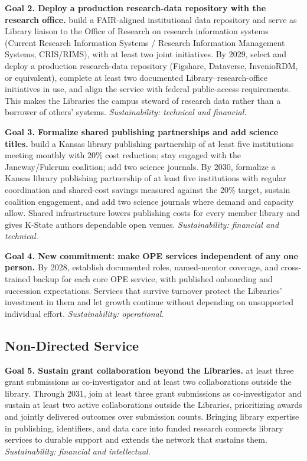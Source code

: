 \textbf{Goal 2. Deploy a production research-data repository with the research office.}  build a FAIR-aligned institutional data repository and serve as Library liaison to the Office of Research on research information systems (Current Research Information Systems / Research Information Management Systems, CRIS/RIMS), with at least two joint initiatives. By 2029, select and deploy a production research-data repository (Figshare, Dataverse, InvenioRDM, or equivalent), complete at least two documented Library--research-office initiatives in use, and align the service with federal public-access requirements. This makes the Libraries the campus steward of research data rather than a borrower of others' systems. \textit{Sustainability: technical and financial.}

\textbf{Goal 3. Formalize shared publishing partnerships and add science titles.}  build a Kansas library publishing partnership of at least five institutions meeting monthly with 20\% cost reduction; stay engaged with the Janeway/Fulcrum coalition; add two science journals. By 2030, formalize a Kansas library publishing partnership of at least five institutions with regular coordination and shared-cost savings measured against the 20\% target, sustain coalition engagement, and add two science journals where demand and capacity allow. Shared infrastructure lowers publishing costs for every member library and gives K-State authors dependable open venues. \textit{Sustainability: financial and technical.}

\textbf{Goal 4. New commitment: make OPE services independent of any one person.} By 2028, establish documented roles, named-mentor coverage, and cross-trained backup for each core OPE service, with published onboarding and succession expectations. Services that survive turnover protect the Libraries' investment in them and let growth continue without depending on unsupported individual effort. \textit{Sustainability: operational.}

\subsection{Non-Directed Service}
\textbf{Goal 5. Sustain grant collaboration beyond the Libraries.}  at least three grant submissions as co-investigator and at least two collaborations outside the library. Through 2031, join at least three grant submissions as co-investigator and sustain at least two active collaborations outside the Libraries, prioritizing awards and jointly delivered outcomes over submission counts. Bringing library expertise in publishing, identifiers, and data care into funded research connects library services to durable support and extends the network that sustains them. \textit{Sustainability: financial and intellectual.}

